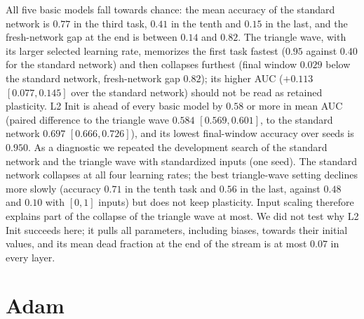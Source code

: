 \documentclass[11pt,a4paper]{article}
\begin{document}
All five basic models fall towards chance: the mean accuracy of the standard network is $0.77$ in the third
task, $0.41$ in the tenth and $0.15$ in the last, and the fresh-network gap at the end is between $0.14$ and
$0.82$. The triangle wave, with its larger selected learning rate, memorizes the first task fastest ($0.95$
against $0.40$ for the standard network) and then collapses furthest (final window $0.029$ below the standard
network, fresh-network gap $0.82$); its higher AUC ($+0.113$ $[0.077,0.145]$ over the standard network) should
not be read as retained plasticity. L2 Init is ahead of every basic model by $0.58$ or more in mean AUC (paired
difference to the triangle wave $0.584$ $[0.569,0.601]$, to the standard network $0.697$ $[0.666,0.726]$), and
its lowest final-window accuracy over seeds is $0.950$. As a diagnostic we repeated the development search of
the standard network and the triangle wave with standardized inputs (one seed). The standard network collapses
at all four learning rates; the best triangle-wave setting declines more slowly (accuracy $0.71$ in the tenth
task and $0.56$ in the last, against $0.48$ and $0.10$ with $[0,1]$ inputs) but does not keep plasticity. Input
scaling therefore explains part of the collapse of the triangle wave at most. We did not test why L2 Init
succeeds here; it pulls all parameters, including biases, towards their initial values, and its mean dead fraction
at the end of the stream is at most $0.07$ in every layer.

\section{Adam}\label{app:adam}
\end{document}
